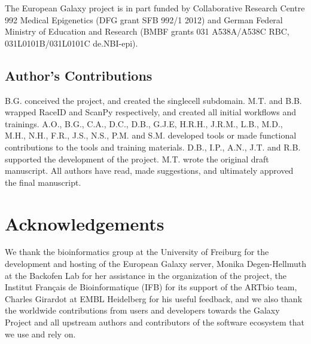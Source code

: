 \documentclass[a4paper,num-refs]{oup-contemporary}
\begin{document}
The European Galaxy project is in part funded by Collaborative Research Centre 992 Medical Epigenetics (DFG grant SFB 992/1 2012) and German Federal Ministry of Education and Research (BMBF grants 031 A538A/A538C RBC, 031L0101B/031L0101C de.NBI-epi).

\subsection{Author's Contributions}

B.G. conceived the project, and created the singlecell subdomain. M.T. and B.B. wrapped RaceID and ScanPy respectively, and created all initial workflows and trainings. A.O., B.G., C.A., D.C., D.B., G.J.E, H.R.H., J.R.M., L.B., M.D., M.H., N.H., F.R., J.S., N.S., P.M. and S.M. developed tools or made functional contributions to the tools and training materials. D.B., I.P., A.N., J.T. and R.B. supported the development of the project. M.T. wrote the original draft manuscript. All authors have read, made suggestions, and ultimately approved the final manuscript.

\section{Acknowledgements}

We thank the bioinformatics group at the University of Freiburg for the development and hosting of the European Galaxy server, Monika Degen-Hellmuth at the Backofen Lab for her assistance in the organization of the project, the Institut Français de Bioinformatique (IFB) for its support of the ARTbio team, Charles Girardot at EMBL Heidelberg for his useful feedback, and we also thank the worldwide contributions from users and developers towards the Galaxy Project and all upstream authors and contributors of the software ecosystem that we use and rely on.


\end{document}

